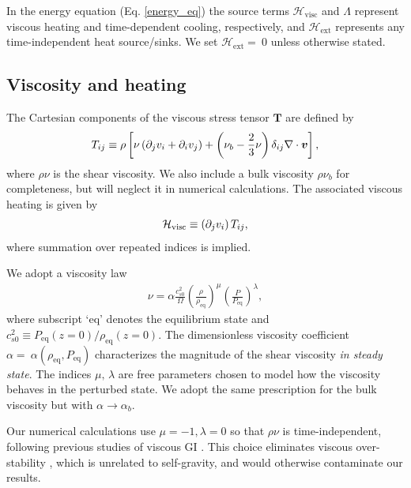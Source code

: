 In the energy equation (Eq. \ref{energy_eq}) the source terms 
$\mathcal{H}_\mathrm{visc}$ and $\Lambda$
represent viscous heating and time-dependent cooling, 
respectively, and $\mathcal{H}_\mathrm{ext}$ represents any
time-independent heat source/sinks. We set
$\mathcal{H}_\mathrm{ext}=~0$ unless otherwise stated.  

\subsection{Viscosity and heating}\label{visc_model}
The Cartesian components of the viscous stress tensor $\bm{T}$ are
defined by 
\begin{align}
  T_{ij} \equiv \rho \left[\nu \left(\partial_j v_i + \partial_i v_j\right) +
    \left(\nu_b-\frac{2}{3}\nu\right)\delta_{ij}\nabla\cdot\bm{v}\right], 
\end{align}
where $\rho\nu$ is the shear viscosity. We also include a bulk
viscosity $\rho\nu_b$ for completeness, but will neglect it in
numerical calculations. The associated viscous heating is given by 
\begin{align}
  \mathcal{H}_\mathrm{visc} \equiv \left(\partial_jv_i\right)T_{ij}, 
\end{align}
where summation over repeated indices is implied. 

We adopt a viscosity law  
\begin{align}\label{visc_law}
  \nu = \alpha
  \frac{c_{s0}^2}{\Omega}\left(\frac{\rho}{\rho_\mathrm{eq}}\right)^\mu\left(\frac{P}{P_\mathrm{eq}}\right)^\lambda,             
\end{align}
where subscript `eq' denotes the equilibrium state and  
$c_{s0}^2\equiv P_\mathrm{eq}(z=0)/\rho_\mathrm{eq}(z=0)$. 
The dimensionless viscosity coefficient 
$\alpha=~\alpha(\rho_\mathrm{eq},P_\mathrm{eq})$ characterizes the
magnitude of the shear viscosity \emph{in steady state}. The indices
$\mu,\,\lambda$ are free parameters chosen to model how the viscosity
behaves in the perturbed state.  
We adopt the same prescription for the bulk viscosity but
with $\alpha\to\alpha_b$.   

Our numerical calculations use $\mu=-1,\lambda=0$ so 
that $\rho\nu$ is time-independent, following previous 
studies of viscous GI  
\citep{lynden-bell74,hunter83,willerding92,gammie96}.  
This choice eliminates viscous over-stability
\citep{schmit95,latter06}, which is unrelated to self-gravity, and
would otherwise contaminate our results. %

